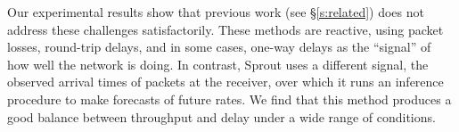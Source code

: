 Our experimental results show that previous work (see
\S\ref{s:related}) does not address these challenges
satisfactorily. These methods are reactive, using packet
losses, round-trip delays, and in some cases, one-way delays as the
``signal'' of how well the network is doing. In contrast, Sprout uses
a different signal, the observed arrival times of packets at the
receiver, over which it runs an inference procedure to make
forecasts of future rates. We find that this method produces a good
balance between throughput and delay under a wide range of
conditions.


